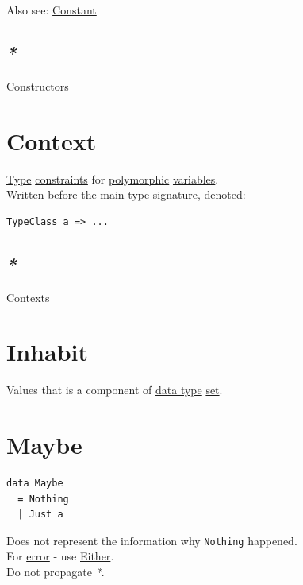 \documentclass[a4paper,14pt,oneside]{book}
\begin{document}
Also see: \hyperref[org15ab12b]{Constant}\\

\subsection{\emph{*}}
\label{sec:org0f7697a}

\label{org6922528}Constructors\\

\section{\label{org5afd675}Context}
\label{sec:orgd4d98a5}
\hyperref[org258d25a]{Type} \hyperref[org9f5f3d4]{constraints} for \hyperref[org0bb8292]{polymorphic} \hyperref[org4277fa3]{variables}.\\
Written before the main \hyperref[org258d25a]{type} signature, denoted:\\
\begin{verbatim}
TypeClass a => ...
\end{verbatim}

\subsection{\emph{*}}
\label{sec:org45f3c75}

\label{org4e8f28b}Contexts\\

\section{\label{org9e8ed00}Inhabit}
\label{sec:orgab60945}
Values that is a component of \hyperref[orga639c70]{data type} \hyperref[org297bd45]{set}.\\

\section{\label{org117baa8}Maybe}
\label{sec:org2a78f6b}
\begin{verbatim}
data Maybe
  = Nothing
  | Just a
\end{verbatim}

Does not represent the information why \texttt{Nothing} happened.\\
For \hyperref[orgdcf9b0c]{error} - use \hyperref[org9d2b806]{Either}.\\
Do not propagate \emph{*}.\\
\end{document}
